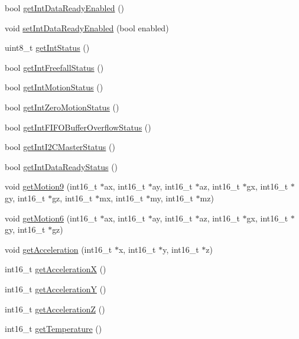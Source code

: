 \begin{DoxyCompactItemize}
bool \hyperlink{class_m_p_u6050_ae15f6043a74c9c9bf9754824802ce8d3}{get\+Int\+Data\+Ready\+Enabled} ()
\item 
void \hyperlink{class_m_p_u6050_a67a11be7fc7ab6b1186469b94ea33dda}{set\+Int\+Data\+Ready\+Enabled} (bool enabled)
\item 
uint8\+\_\+t \hyperlink{class_m_p_u6050_a550a735623cb1de950c72cd6931ee804}{get\+Int\+Status} ()
\item 
bool \hyperlink{class_m_p_u6050_a06bbc2116235b7cc5e28c877e0576749}{get\+Int\+Freefall\+Status} ()
\item 
bool \hyperlink{class_m_p_u6050_ac0c0836aa0d237cac92d11591efd0d9f}{get\+Int\+Motion\+Status} ()
\item 
bool \hyperlink{class_m_p_u6050_afa73a5ffdc423736ae88702a469ba3a0}{get\+Int\+Zero\+Motion\+Status} ()
\item 
bool \hyperlink{class_m_p_u6050_aa31427588f059c69d93ddb00ba257b12}{get\+Int\+F\+I\+F\+O\+Buffer\+Overflow\+Status} ()
\item 
bool \hyperlink{class_m_p_u6050_a31d6c2b03fc2d6ce82d67d142f316851}{get\+Int\+I2\+C\+Master\+Status} ()
\item 
bool \hyperlink{class_m_p_u6050_ae4f434eb51a15b536e2e8f89a776872b}{get\+Int\+Data\+Ready\+Status} ()
\item 
void \hyperlink{class_m_p_u6050_aabfd2920e748016383e8124a4b32ad31}{get\+Motion9} (int16\+\_\+t $\ast$ax, int16\+\_\+t $\ast$ay, int16\+\_\+t $\ast$az, int16\+\_\+t $\ast$gx, int16\+\_\+t $\ast$gy, int16\+\_\+t $\ast$gz, int16\+\_\+t $\ast$mx, int16\+\_\+t $\ast$my, int16\+\_\+t $\ast$mz)
\item 
void \hyperlink{class_m_p_u6050_a574d3093dc131e4251a9b37adf208ca7}{get\+Motion6} (int16\+\_\+t $\ast$ax, int16\+\_\+t $\ast$ay, int16\+\_\+t $\ast$az, int16\+\_\+t $\ast$gx, int16\+\_\+t $\ast$gy, int16\+\_\+t $\ast$gz)
\item 
void \hyperlink{class_m_p_u6050_a658dfc7e35b7fdba360a75f137bde33a}{get\+Acceleration} (int16\+\_\+t $\ast$x, int16\+\_\+t $\ast$y, int16\+\_\+t $\ast$z)
\item 
int16\+\_\+t \hyperlink{class_m_p_u6050_aa68475158c22128e5459c4c5e19439dc}{get\+Acceleration\+X} ()
\item 
int16\+\_\+t \hyperlink{class_m_p_u6050_a27240b90d3e03c85b7a619b794bb1756}{get\+Acceleration\+Y} ()
\item 
int16\+\_\+t \hyperlink{class_m_p_u6050_acf5f5a20c10d99a1bdedf139f897bfdf}{get\+Acceleration\+Z} ()
\item 
int16\+\_\+t \hyperlink{class_m_p_u6050_aedfa4f1e6507f48c0a09545345a87875}{get\+Temperature} ()

\end{DoxyCompactItemize}

